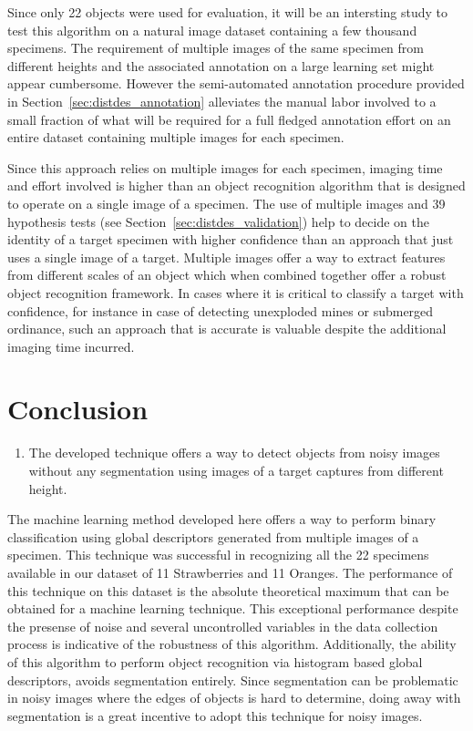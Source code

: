 \documentclass {udthesis}
\begin{document}
Since only 22 objects were used for evaluation, it will be an intersting study to test this algorithm on a natural image dataset containing a few thousand specimens. The requirement of multiple images of the same specimen from different heights and the associated annotation on a large learning set might appear cumbersome. However the semi-automated annotation procedure provided in Section~\ref{sec:distdes_annotation} alleviates the manual labor involved to a small fraction of what will be required for a full fledged annotation effort on an entire dataset containing multiple images for each specimen.

Since this approach relies on multiple images for each specimen, imaging time and effort involved is higher than an object recognition algorithm that is designed to operate on a single image of a specimen. The use of multiple images and 39 hypothesis tests (see Section~\ref{sec:distdes_validation}) help to decide on the identity of a target specimen with higher confidence than an approach that just uses a single image of a target. Multiple images offer a way to extract features from different scales of an object which when combined together offer a robust object recognition framework. In cases where it is critical to classify a target with confidence, for instance in case of detecting unexploded mines or submerged ordinance, such an approach that is accurate is  valuable despite the additional imaging time incurred.

\section{Conclusion}
\begin{enumerate}
        \item The developed technique offers a way to detect objects from noisy images without any segmentation using images of a target captures from different height.
\end{enumerate}

The machine learning method developed here offers a way to perform binary classification using global descriptors generated from multiple images of a specimen. This technique was successful in recognizing all the 22 specimens available in our dataset of 11 Strawberries and 11 Oranges. The performance of this technique on this dataset is the absolute theoretical maximum that can be obtained for a machine learning technique. This exceptional performance despite the presense of noise and several uncontrolled variables in the data collection process is indicative of the robustness of this algorithm. Additionally, the ability of this algorithm to perform object recognition via histogram based global descriptors, avoids segmentation entirely. Since segmentation can be problematic in noisy images where the edges of objects is hard to determine, doing away with segmentation is a great incentive to adopt this technique for noisy images.
\end{document}
